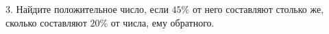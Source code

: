 3. Найдите положительное число, если $45\%$ от него составляют столько же, сколько составляют $20\%$ от числа, ему обратного.\\
